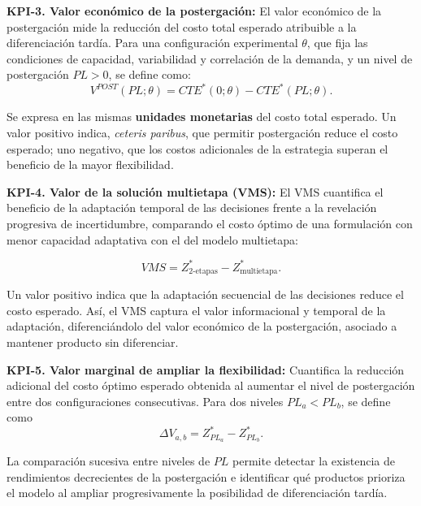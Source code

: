 \medskip
\noindent\textbf{KPI-3. Valor económico de la postergación: }El valor económico de la postergación mide la reducción del costo total esperado atribuible a la diferenciación tardía. Para una configuración experimental $\theta$, que fija las condiciones de capacidad, variabilidad y correlación de la demanda, y un nivel de postergación $PL>0$, se define como:
\begin{equation}
    V^{POST}(PL;\theta)
    =
    CTE^{*}(0;\theta)
    -
    CTE^{*}(PL;\theta).
\end{equation}

Se expresa en las mismas \textbf{unidades monetarias} del costo total esperado. Un valor positivo indica, \textit{ceteris paribus}, que permitir postergación reduce el costo esperado; uno negativo, que los costos adicionales de la estrategia superan el beneficio de la mayor flexibilidad.

\medskip
\noindent\textbf{KPI-4. Valor de la solución multietapa (VMS): }El VMS cuantifica el beneficio de la adaptación temporal de las decisiones frente a la revelación progresiva de incertidumbre, comparando el costo óptimo de una formulación con menor capacidad adaptativa con el del modelo multietapa:

\begin{equation}
    VMS =
    Z^{*}_{2\text{-etapas}}
    -
    Z^{*}_{\text{multietapa}}.
\end{equation}

Un valor positivo indica que la adaptación secuencial de las decisiones reduce el costo esperado. Así, el VMS captura el valor informacional y temporal de la adaptación, diferenciándolo del valor económico de la postergación, asociado a mantener producto sin diferenciar.

\medskip
\noindent\textbf{KPI-5. Valor marginal de ampliar la flexibilidad: }Cuantifica la reducción adicional del costo óptimo esperado obtenida al aumentar el nivel de postergación entre dos configuraciones consecutivas. Para dos niveles $PL_a < PL_b$, se define como
\begin{equation}
    \Delta V_{a,b} = Z^*_{PL_a} - Z^*_{PL_b}.
    \label{eq:valor_marginal}
\end{equation}

La comparación sucesiva entre niveles de $PL$ permite detectar la existencia de rendimientos decrecientes de la postergación e identificar qué productos prioriza el modelo al ampliar progresivamente la posibilidad de diferenciación tardía.


